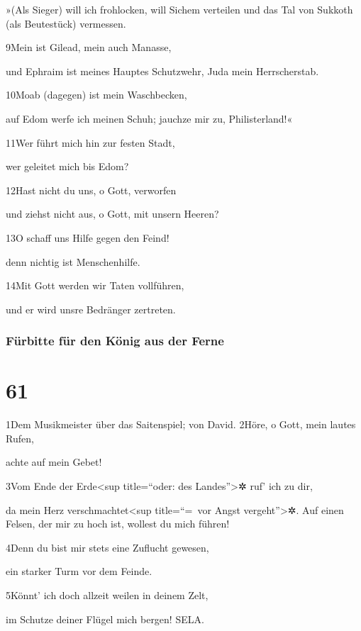 »(Als Sieger) will ich frohlocken, will Sichem verteilen und das Tal von
Sukkoth (als Beutestück) vermessen.

9Mein ist Gilead, mein auch Manasse,

und Ephraim ist meines Hauptes Schutzwehr, Juda mein Herrscherstab.

10Moab (dagegen) ist mein Waschbecken,

auf Edom werfe ich meinen Schuh; jauchze mir zu, Philisterland!«

11Wer führt mich hin zur festen Stadt,

wer geleitet mich bis Edom?

12Hast nicht du uns, o Gott, verworfen

und ziehst nicht aus, o Gott, mit unsern Heeren?

13O schaff uns Hilfe gegen den Feind!

denn nichtig ist Menschenhilfe.

14Mit Gott werden wir Taten vollführen,

und er wird unsre Bedränger zertreten.

\hypertarget{fuxfcrbitte-fuxfcr-den-kuxf6nig-aus-der-ferne}{%
\subsubsection{Fürbitte für den König aus der
Ferne}\label{fuxfcrbitte-fuxfcr-den-kuxf6nig-aus-der-ferne}}

\hypertarget{section-60}{%
\section{61}\label{section-60}}

1Dem Musikmeister über das Saitenspiel; von David. 2Höre, o Gott, mein
lautes Rufen,

achte auf mein Gebet!

3Vom Ende der Erde\textless sup title=``oder: des Landes''\textgreater✲
ruf' ich zu dir,

da mein Herz verschmachtet\textless sup title=``=~vor Angst
vergeht''\textgreater✲. Auf einen Felsen, der mir zu hoch ist, wollest
du mich führen!

4Denn du bist mir stets eine Zuflucht gewesen,

ein starker Turm vor dem Feinde.

5Könnt' ich doch allzeit weilen in deinem Zelt,

im Schutze deiner Flügel mich bergen! SELA.

